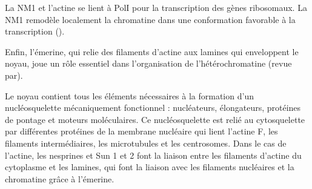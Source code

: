 \documentclass{report}
\begin{document}
La NM1 et l'actine se lient à PolI pour la transcription des gènes ribosomaux. La NM1 remodèle localement la chromatine dans une conformation favorable à la transcription (\cite{nowak_evidence_1997}).

Enfin, l'émerine, qui relie des filaments d'actine aux lamines qui enveloppent le noyau, joue un rôle essentiel dans l'organisation de l'hétérochromatine (revue par\cite{gieni_actin_2009}). 


Le noyau contient tous les éléments nécessaires à la formation d'un nucléosquelette mécaniquement fonctionnel : nucléateurs, élongateurs, protéines de pontage et moteurs moléculaires. 
Ce nucléosquelette est relié au cytosquelette par différentes protéines de la membrane nucléaire qui lient l'actine F, les filaments intermédiaires, les microtubules et les centrosomes. 
Dans le cas de l'actine, les nesprines et Sun 1 et 2 font la liaison entre les filaments d'actine du cytoplasme et les lamines, qui font la liaison avec les filaments nucléaires et la chromatine grâce à l'émerine. 
\end{document}
